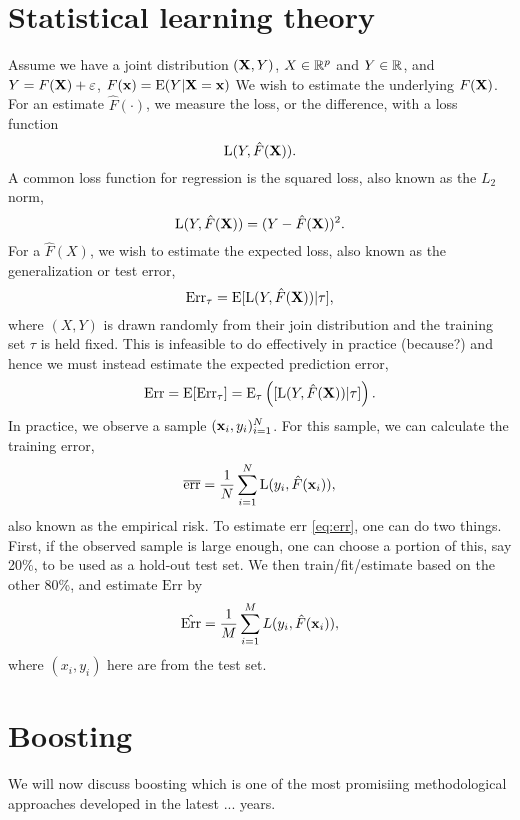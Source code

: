 \section{Statistical learning theory}
Assume we have a joint distribution $(\mathbf{X}, Y)$, $X\in\mathbb{R}^p$ and $Y\in\mathbb{R}$, and $Y=F(\mathbf{X})+\varepsilon$, $F(\mathbf{x})=\operatorname{E}(Y|\mathbf{X}=\mathbf{x})$ We wish to estimate the underlying $F(\mathbf{X})$. For an estimate $\hat{F}(\cdot)$, we measure the loss, or the difference, with a loss function
\begin{equation}
    \operatorname{L}(Y, \hat{F}(\mathbf{X})).
\end{equation}
A common loss function for regression is the squared loss, also known as the $L_2$ norm,
\begin{equation}
    \operatorname{L}(Y, \hat{F}(\mathbf{X}))=(Y-\hat{F}(\mathbf{X}))^2.
\end{equation}
For a $\hat{F}(X)$, we wish to estimate the expected loss, also known as the generalization or test error,
\begin{equation}
    \text{Err}_{\tau}=\operatorname{E}[\operatorname{L}(Y,\hat{F}(\mathbf{X}))|\tau],
\end{equation}
where $(X,Y)$ is drawn randomly from their join distribution and the training set $\tau$ is held fixed. This is infeasible to do effectively in practice (because?) and hence we must instead estimate the expected prediction error,
\begin{equation}\label{eq:err}
    \text{Err}=\operatorname{E}[\text{Err}_\tau]=\operatorname{E}_\tau\left([\operatorname{L}(Y,\hat{F}(\mathbf{X}))|\tau]\right).
\end{equation}
In practice, we observe a sample $(\mathbf{x}_i,y_i)_{i=1}^N$. For this sample, we can calculate the training error,
\begin{equation}
    \overline{\text{err}}=\frac{1}{N}\sum_{i=1}^N\operatorname{L}(y_i, \hat{F}(\mathbf{x}_i)),
\end{equation}
also known as the empirical risk. To estimate $\text{err}$ \eqref{eq:err}, one can do two things. First, if the observed sample is large enough, one can choose a portion of this, say 20\%, to be used as a hold-out test set. We then train/fit/estimate based on the other 80\%, and estimate $\text{Err}$ by
\begin{equation}
    \hat{\text{Err}}=\frac{1}{M}\sum_{i=1}^ML(y_i,\hat{F}(\mathbf{x}_i)),
\end{equation}
where $(x_i,y_i)$ here are from the test set.

\section{Boosting}
We will now discuss boosting which is one of the most promisiing methodological approaches developed in the latest ... years.

